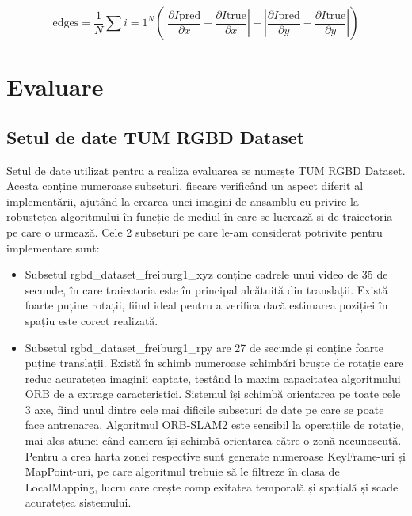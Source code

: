 \documentclass[12pt,a4paper]{report}
\begin{document}
\begin{equation}
{\text{edges}} = \frac{1}{N} \sum{i=1}^{N} \left(
\left| \frac{\partial I{\text{pred}}}{\partial x} - \frac{\partial I{\text{true}}}{\partial x} \right| +
\left| \frac{\partial I{\text{pred}}}{\partial y} - \frac{\partial I{\text{true}}}{\partial y} \right|
\right)
\end{equation}

\chapter{Evaluare}
\section{Setul de date TUM RGBD Dataset}
Setul de date utilizat pentru a realiza evaluarea se numește TUM RGBD Dataset\cite{tum}.
Acesta conține numeroase subseturi, fiecare verificând un aspect diferit al implementării,
ajutând la crearea unei imagini de ansamblu cu privire la robustețea algoritmului în funcție
de mediul în care se lucrează și de traiectoria pe care o urmează. Cele 2 subseturi pe
care le-am considerat potrivite pentru implementare sunt:

\begin{itemize}
\item Subsetul rgbd\_dataset\_freiburg1\_xyz conține cadrele unui video de 35 de secunde, în care
traiectoria este în principal alcătuită din translații. Există foarte puține rotații, fiind
ideal pentru a verifica dacă estimarea poziției în spațiu este corect realizată.

\item Subsetul rgbd\_dataset\_freiburg1\_rpy are 27 de secunde și conține
foarte puține translații. Există în schimb numeroase schimbări bruște de rotație care reduc
acuratețea imaginii captate, testând la maxim capacitatea algoritmului ORB de a extrage
caracteristici. Sistemul își schimbă orientarea pe toate cele 3 axe, fiind unul dintre cele
mai dificile subseturi de date pe care se poate face antrenarea. Algoritmul
ORB-SLAM2 este sensibil la operațiile de rotație, mai ales atunci când camera își schimbă
orientarea către o zonă necunoscută. Pentru a crea harta zonei respective sunt generate
numeroase KeyFrame-uri și MapPoint-uri, pe care algoritmul trebuie să le filtreze în clasa
de LocalMapping, lucru care crește complexitatea temporală și spațială și scade acuratețea
sistemului.
\end{itemize} 
\end{document}
